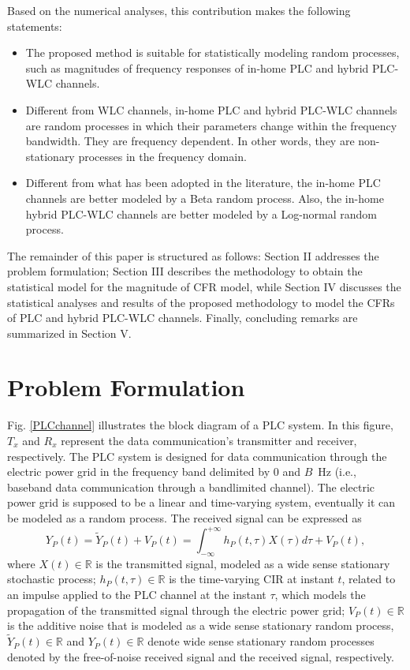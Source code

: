 \documentclass[journal]{IEEEtran}
\begin{document}
Based on the numerical analyses, this contribution makes the following statements:
\begin{itemize}
    \item The proposed method is suitable for statistically modeling random processes, such as magnitudes of frequency responses of in-home \ac{PLC} and hybrid \ac{PLC}-\ac{WLC} channels.
    \item Different from \ac{WLC} channels, in-home \ac{PLC} and hybrid \ac{PLC}-\ac{WLC} channels are random processes in which their parameters change within the frequency bandwidth. They are frequency dependent. In other words, they are non-stationary processes in the frequency domain. 
    \item Different from what has been adopted in the literature, the in-home \ac{PLC} channels are better modeled by a Beta random process. Also, the in-home hybrid \ac{PLC}-\ac{WLC} channels are better modeled by a Log-normal random process. 
\end{itemize}

The remainder of this paper is structured as follows: Section II addresses
the problem formulation; Section III describes the methodology to obtain the statistical model for the magnitude of \ac{CFR} model, while Section IV discusses the statistical analyses and results of the proposed methodology to model the \acp{CFR} of \ac{PLC} and hybrid \ac{PLC}-\ac{WLC} channels. Finally, concluding remarks are summarized in Section V.

\section{Problem Formulation}

Fig. \ref{PLCchannel} illustrates the block diagram of a \ac{PLC} system. In this figure, $T_x$ and $R_x$ represent the data communication's transmitter and receiver, respectively. The \ac{PLC} system is designed for data communication through the electric power grid in the frequency band delimited by $0$ and $B$~Hz (i.e., baseband data communication through a bandlimited channel). The electric power grid is supposed to be a linear and time-varying system, eventually it can be modeled as a random process. The received signal can be expressed as
\begin{equation} \label{received signal}
Y_P(t) = \tilde{Y}_P(t)+V_P(t) = \int_{-\infty}^{+\infty} h_P(t,\tau) X(\tau) d\tau + V_P(t),
\end{equation}
where $X(t)\in \mathbb{R}$ is the transmitted signal, modeled as a wide sense stationary stochastic process; $h_P(t,\tau)\in \mathbb{R}$ is the time-varying \ac{CIR} at instant $t$, related to an impulse applied to the \ac{PLC} channel at the instant $\tau$, which models the propagation of the transmitted signal through the electric power grid; $V_P(t)\in \mathbb{R}$ is the additive noise that is modeled as a wide sense stationary random process, $\tilde{Y}_P(t)\in \mathbb{R}$ and $Y_P(t)\in \mathbb{R}$ denote wide sense stationary random processes denoted by the free-of-noise received signal and the received signal, respectively.
\end{document}
